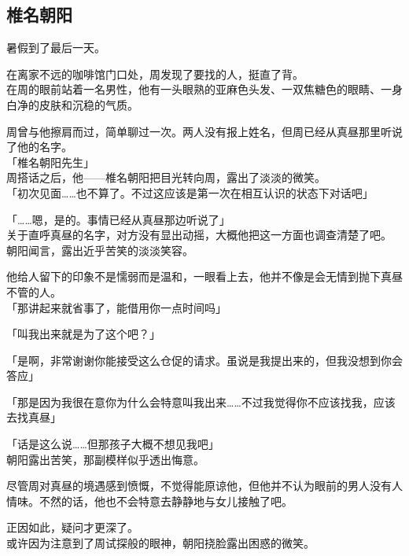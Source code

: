 \subsection{椎名朝阳}

暑假到了最后一天。

在离家不远的咖啡馆门口处，周发现了要找的人，挺直了背。\\

在周的眼前站着一名男性，他有一头眼熟的亚麻色头发、一双焦糖色的眼睛、一身白净的皮肤和沉稳的气质。

周曾与他擦肩而过，简单聊过一次。两人没有报上姓名，但周已经从真昼那里听说了他的名字。\\

「椎名朝阳先生」\\

周搭话之后，他——椎名朝阳把目光转向周，露出了淡淡的微笑。\\

「初次见面……也不算了。不过这应该是第一次在相互认识的状态下对话吧」

「……嗯，是的。事情已经从真昼那边听说了」\\

关于直呼真昼的名字，对方没有显出动摇，大概他把这一方面也调查清楚了吧。\\

朝阳闻言，露出近乎苦笑的淡淡笑容。

他给人留下的印象不是懦弱而是温和，一眼看上去，他并不像是会无情到抛下真昼不管的人。\\

「那讲起来就省事了，能借用你一点时间吗」

「叫我出来就是为了这个吧？」

「是啊，非常谢谢你能接受这么仓促的请求。虽说是我提出来的，但我没想到你会答应」

「那是因为我很在意你为什么会特意叫我出来……不过我觉得你不应该找我，应该去找真昼」

「话是这么说……但那孩子大概不想见我吧」\\

朝阳露出苦笑，那副模样似乎透出悔意。

尽管周对真昼的境遇感到愤慨，不觉得能原谅他，但他并不认为眼前的男人没有人情味。不然的话，他也不会特意去静静地与女儿接触了吧。

正因如此，疑问才更深了。\\

或许因为注意到了周试探般的眼神，朝阳挠脸露出困惑的微笑。\\

